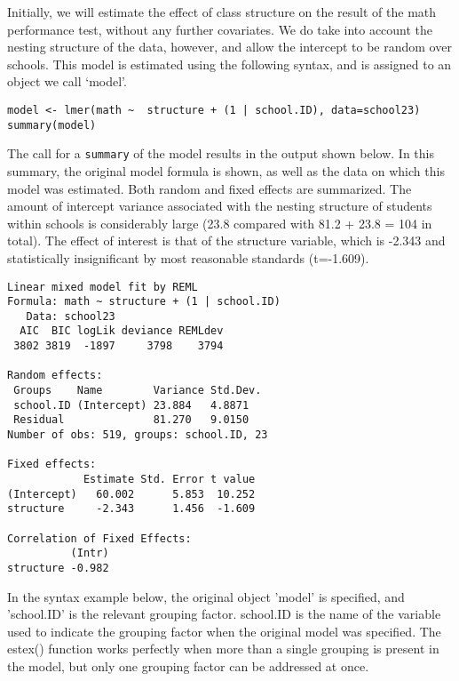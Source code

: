 \documentclass[12pt, a4paper]{article}
\begin{document}
Initially, we will estimate the effect of class structure on the result of the math performance test, without any further covariates. We do take into account the nesting structure of the data, however, and allow the intercept to be random over schools. This model is estimated using the following syntax, and is assigned to an object we call ‘model’.
\begin{framed}
\begin{verbatim}
model <- lmer(math ~  structure + (1 | school.ID), data=school23)
summary(model)
\end{verbatim}
\end{framed}
The call for a \texttt{summary} of the model results in the output shown below. In this summary, the original model formula is shown, as well as the data on which this model was estimated. Both random and fixed effects are summarized. The amount of intercept variance associated with the nesting structure of students within schools is considerably large (23.8 compared with 81.2 + 23.8 = 104 in total). The effect of interest is that of the structure variable, which is -2.343 and statistically insignificant by most reasonable standards (t=-1.609).

\begin{framed}
\begin{verbatim}
Linear mixed model fit by REML 
Formula: math ~ structure + (1 | school.ID) 
   Data: school23 
  AIC  BIC logLik deviance REMLdev
 3802 3819  -1897     3798    3794
 
Random effects:
 Groups    Name        Variance Std.Dev.
 school.ID (Intercept) 23.884   4.8871  
 Residual              81.270   9.0150  
Number of obs: 519, groups: school.ID, 23

Fixed effects:
            Estimate Std. Error t value
(Intercept)   60.002      5.853  10.252
structure     -2.343      1.456  -1.609

Correlation of Fixed Effects:
          (Intr)
structure -0.982
\end{verbatim}
\end{framed}

In the syntax example below, the original object 'model' is specified, and 'school.ID' is the relevant grouping factor. school.ID is the name of the variable used to indicate the grouping factor when the original model was specified. The estex() function works perfectly when more than a single grouping is present in the model, but only one grouping factor can be addressed at once.
\end{document}
